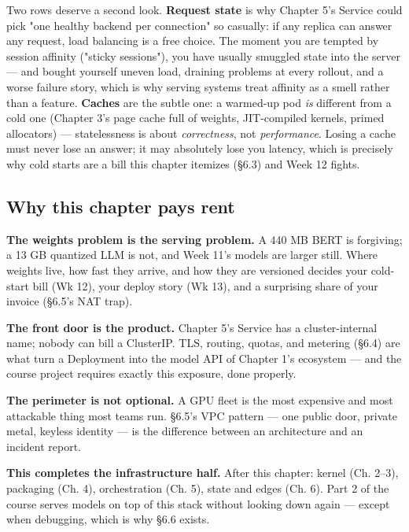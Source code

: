 Two rows deserve a second look. \textbf{Request state} is why Chapter 5's Service could pick "one healthy backend per connection" so casually: if any replica can answer any request, load balancing is a free choice. The moment you are tempted by session affinity ("sticky sessions"), you have usually smuggled state into the server — and bought yourself uneven load, draining problems at every rollout, and a worse failure story, which is why serving systems treat affinity as a smell rather than a feature. \textbf{Caches} are the subtle one: a warmed-up pod \textit{is} different from a cold one (Chapter 3's page cache full of weights, JIT-compiled kernels, primed allocators) — statelessness is about \textit{correctness}, not \textit{performance}. Losing a cache must never lose an answer; it may absolutely lose you latency, which is precisely why cold starts are a bill this chapter itemizes (§6.3) and Week 12 fights.

\subsection*{Why this chapter pays rent}

\begin{tbbitemize}
  \item \textbf{The weights problem is the serving problem.} A 440 MB BERT is forgiving; a 13 GB quantized LLM is not, and Week 11's models are larger still. Where weights live, how fast they arrive, and how they are versioned decides your cold-start bill (Wk 12), your deploy story (Wk 13), and a surprising share of your invoice (§6.5's NAT trap).
  \item \textbf{The front door is the product.} Chapter 5's Service has a cluster-internal name; nobody can bill a ClusterIP. TLS, routing, quotas, and metering (§6.4) are what turn a Deployment into the model API of Chapter 1's ecosystem — and the course project requires exactly this exposure, done properly.
  \item \textbf{The perimeter is not optional.} A GPU fleet is the most expensive and most attackable thing most teams run. §6.5's VPC pattern — one public door, private metal, keyless identity — is the difference between an architecture and an incident report.
  \item \textbf{This completes the infrastructure half.} After this chapter: kernel (Ch. 2–3), packaging (Ch. 4), orchestration (Ch. 5), state and edges (Ch. 6). Part 2 of the course serves models on top of this stack without looking down again — except when debugging, which is why §6.6 exists.
\end{tbbitemize}

